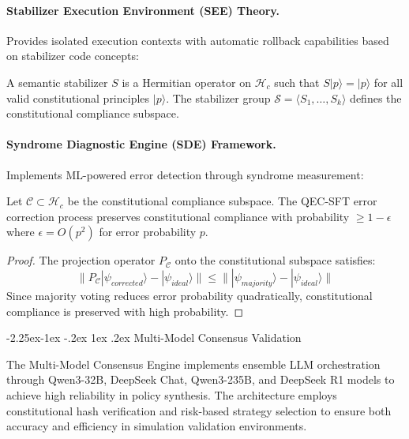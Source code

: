\documentclass[manuscript,screen,9pt]{acmart}
\makeatletter
\renewcommand\subsection{\@startsection{subsection}{2}{\z@}%
  {-2.25ex\@plus -1ex \@minus -.2ex}%
  {1ex \@plus .2ex}%
  {\normalfont\large\bfseries}}
\makeatother
\begin{document}
\paragraph{Stabilizer Execution Environment (SEE) Theory.} Provides isolated execution contexts with automatic rollback capabilities based on stabilizer code concepts:

\begin{definition}
A semantic stabilizer $S$ is a Hermitian operator on $\mathcal{H}_c$ such that $S|p\rangle = |p\rangle$ for all valid constitutional principles $|p\rangle$. The stabilizer group $\mathcal{S} = \langle S_1, \ldots, S_k \rangle$ defines the constitutional compliance subspace.
\end{definition}

\paragraph{Syndrome Diagnostic Engine (SDE) Framework.} Implements ML-powered error detection through syndrome measurement:

\begin{theorem}
Let $\mathcal{C} \subset \mathcal{H}_c$ be the constitutional compliance subspace. The QEC-SFT error correction process preserves constitutional compliance with probability $\geq 1 - \epsilon$ where $\epsilon = O(p^2)$ for error probability $p$.
\end{theorem}

\begin{proof}
The projection operator $P_{\mathcal{C}}$ onto the constitutional subspace satisfies:
$$\|P_{\mathcal{C}}|\psi_{corrected}\rangle - |\psi_{ideal}\rangle\| \leq \||\psi_{majority}\rangle - |\psi_{ideal}\rangle\|$$
Since majority voting reduces error probability quadratically, constitutional compliance is preserved with high probability.
\end{proof}

\subsection{Multi-Model Consensus Validation}
\label{subsec:multi_model_consensus}

The Multi-Model Consensus Engine implements ensemble LLM orchestration through Qwen3-32B, DeepSeek Chat, Qwen3-235B, and DeepSeek R1 models to achieve high reliability in policy synthesis. The architecture employs constitutional hash verification and risk-based strategy selection to ensure both accuracy and efficiency in simulation validation environments.
\end{document}
